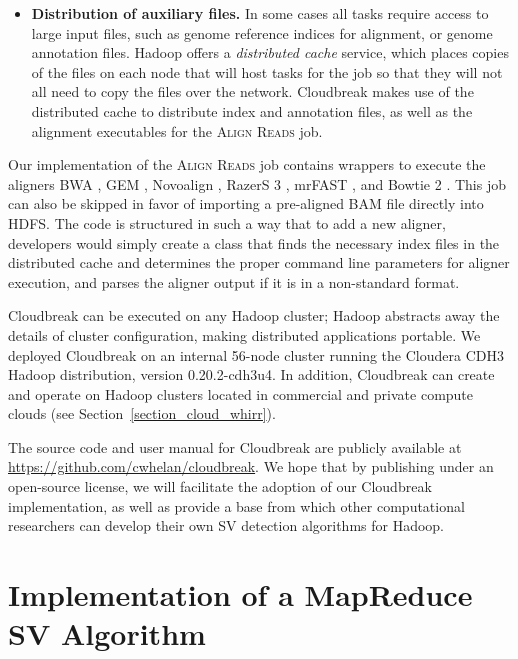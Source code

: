 \begin{itemize}
\item \textbf{Distribution of auxiliary files.} In some cases all tasks require access to large input files, such as genome reference indices for alignment, or genome annotation files. Hadoop offers a \emph{distributed cache} service, which places copies of the files on each node that will host tasks for the job so that they will not all need to copy the files over the network. Cloudbreak makes use of the distributed cache to distribute index and annotation files, as well as the alignment executables for the \textsc{Align Reads} job.
\end{itemize}

Our implementation of the \textsc{Align Reads} job contains wrappers to execute the aligners BWA \cite{Li:2009p836}, GEM \cite{MarcoSola:2012hm}, Novoalign \cite{novoalign}, RazerS 3 \cite{Weese:2012by}, mrFAST \cite{Alkan:2009cr}, and Bowtie 2 \cite{Langmead:2012jh}. This job can also be skipped in favor of importing a pre-aligned BAM file directly into HDFS. The code is structured in such a way that to add a new aligner, developers would simply create a class that finds the necessary index files in the distributed cache and determines the proper command line parameters for aligner execution, and parses the aligner output if it is in a non-standard format.

Cloudbreak can be executed on any Hadoop cluster; Hadoop abstracts away the details of cluster configuration, making distributed applications portable. We deployed Cloudbreak on an internal 56-node cluster running the Cloudera CDH3 Hadoop distribution, version 0.20.2-cdh3u4. In addition, Cloudbreak can create and operate on Hadoop clusters located in commercial and private compute clouds (see Section~\ref{section_cloud_whirr}).

The source code and user manual for Cloudbreak are publicly available at \url{https://github.com/cwhelan/cloudbreak}. We hope that by publishing under an open-source license, we will facilitate the adoption of our Cloudbreak implementation, as well as provide a base from which other computational researchers can develop their own SV detection algorithms for Hadoop.

\section{Implementation of a MapReduce SV Algorithm}\label{section_user_defined_functions}

